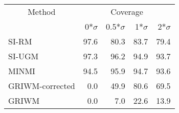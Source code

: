 
\begin{tabular}{lrrrr}
\toprule
\multicolumn{1}{c}{Method} & \multicolumn{4}{c}{Coverage} \\
 & 0*$\sigma$ & 0.5*$\sigma$ & 1*$\sigma$ & 2*$\sigma$\\
\midrule
SI-RM & 97.6 & 80.3 & 83.7 & 79.4\\
SI-UGM & 97.3 & 96.2 & 94.9 & 93.7\\
MINMI & 94.5 & 95.9 & 94.7 & 93.6\\
GRIWM-corrected & 0.0 & 49.9 & 80.6 & 69.5\\
GRIWM & 0.0 & 7.0 & 22.6 & 13.9\\
\bottomrule
\end{tabular}
